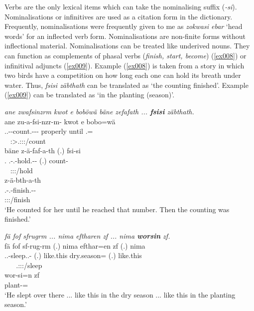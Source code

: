 Verbs are the only lexical items which can take the nominalising suffix (\emph{-si}). Nominalisations or infinitives are used as a citation form in the dictionary. Frequently, nominalisations were frequently given to me as \emph{zokwasi ebar} `head words' for an inflected verb form. Nominalisations are non-finite forms without inflectional material. Nominalisations can be treated like underived nouns. They can function as complements of phasal verbs (\textit{finish, start, become}) (\ref{ex008}) or infinitival adjuncts (\ref{ex009}). Example (\ref{ex008}) is taken from a story in which two birds have a competition on how long each one can hold its breath under water. Thus, \emph{fsisi zäbthath} can be translated as `the counting finished'. Example (\ref{ex009}) can be translated as `in the planting (season)'.

\begin{exe}
	\ex \textit{ane zwafsinzrm kwot e boböwä bäne zefafath ... \textbf{fsisi} zäbthath.}\\
	\glll ane zu-a-fsi-nzr-m-\Zero{} kwot e bobo=wä\\
	{\Dem} \Tsg.\F.\Betatwo-\Vc-count.\Ext-\Ndu-\Dur-\Stsg{} properly until \Med{}.{\All}={\Emph}\\
	~ {\footnotesize \Stsg:\Sbj>\Tsg.\F:\Io:\Pst:\Dur/count} ~ ~ ~ ~\\
	\sn
	\glll bäne z-ä-faf-a-th (.) fsi-si\\
	\Recog.{\Abs} \M.\Gam-\Vc.\Ndu-hold.\Rs-\Pst-\Stnsg{} (.) count-{\Nmlz}\\
	~ {\footnotesize \Stpl:\Sbj:\Pst:\Pfv/hold} ~ ~\\
	\sn
	\glll z-ä-bth-a-th\\
	\M.\Gam-\Vc.\Ndu-finish.\Rs-\Pst-\Stnsg{}\\
	{\footnotesize \Stpl:\Sbj:\Pst:\Pfv/finish}\\
	\trans `He counted for her until he reached that number. Then the counting was finished.' 
	\label{ex008}
\end{exe}
\begin{exe}
	\ex \textit{fä fof sfrugrm ... nima eftharen zf ... nima \textbf{worsin} zf.}\\
	\glll fä fof sf-rug-rm (.) nima efthar=en zf (.) nima\\
	{\Dist} {\Emph} \Tsg.\M.\Betatwo-sleep.\Ext.\Ndu-\Dur{} (.) {like.this} {dry.season=\Loc} {\Imm} (.) {like.this}\\
	~ ~ {\footnotesize \Tsg.\M:\Sbj:\Pst:\Dur/sleep} {} {} ~ ~ ~ ~ ~ ~\\
	\sn
	\gll wor-si=n zf\\
	plant-\Nmlz={\Loc} \Imm\\
	\trans `He slept over there ... like this in the dry season ... like this in the planting season.' 
	\label{ex009}
\end{exe}

